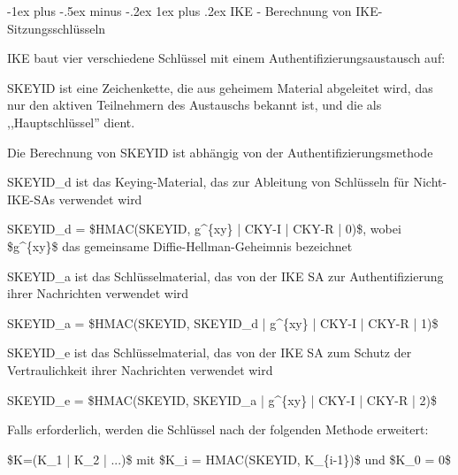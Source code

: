 \documentclass[a4paper]{article}
\makeatletter
\renewcommand{\subsubsection}{\@startsection{subsubsection}{3}{0mm}%
 {-1ex plus -.5ex minus -.2ex}%
 {1ex plus .2ex}%
 {\normalfont\small\bfseries}}
\makeatother
\begin{document}
\begin{multicols}{3}
\begin{itemize*}
            \subsubsection{IKE - Berechnung von
                  IKE-Sitzungsschlüsseln}
            \begin{itemize*}
                  \item       IKE baut vier verschiedene Schlüssel mit einem
                  Authentifizierungsaustausch auf:
                  \begin{itemize*}
                        \item SKEYID ist eine Zeichenkette, die aus geheimem Material abgeleitet wird, das nur den aktiven Teilnehmern des Austauschs bekannt ist, und die als ,,Hauptschlüssel'' dient.
                        \begin{itemize*} \item Die Berechnung von SKEYID ist abhängig von der Authentifizierungsmethode \end{itemize*}
                        \item SKEYID\_d ist das Keying-Material, das zur Ableitung von Schlüsseln für Nicht-IKE-SAs verwendet wird
                        \begin{itemize*} \item SKEYID\_d = \$HMAC(SKEYID, g\^{}\{xy\} | CKY-I | CKY-R | 0)\$, wobei \$g\^{}\{xy\}\$ das gemeinsame Diffie-Hellman-Geheimnis bezeichnet \end{itemize*}
                        \item SKEYID\_a ist das Schlüsselmaterial, das von der IKE SA zur Authentifizierung ihrer Nachrichten verwendet wird
                        \begin{itemize*} \item SKEYID\_a = \$HMAC(SKEYID, SKEYID\_d | g\^{}\{xy\} | CKY-I | CKY-R | 1)\$ \end{itemize*}
                        \item SKEYID\_e ist das Schlüsselmaterial, das von der IKE SA zum Schutz der Vertraulichkeit ihrer Nachrichten verwendet wird
                        \begin{itemize*} \item SKEYID\_e = \$HMAC(SKEYID, SKEYID\_a | g\^{}\{xy\} | CKY-I | CKY-R | 2)\$ \end{itemize*}
                  \end{itemize*}
                  \item       Falls erforderlich, werden die Schlüssel nach der folgenden Methode
                  erweitert:
                  \begin{itemize*}
                        \item \$K=(K\_1 | K\_2 | ...)\$ mit \$K\_i = HMAC(SKEYID, K\_\{i-1\})\$ und \$K\_0 = 0\$
                  \end{itemize*}
            \end{itemize*}


\end{itemize*}
\end{multicols}
\end{document}

